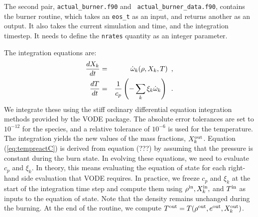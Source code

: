 The second pair, {\tt actual\_burner.f90} and {\tt
  actual\_burner\_data.f90}, contains the burner routine, which takes
an {\tt eos\_t} as an input, and returns another as an output. It also
takes the current simulation and time, and the integration
timestep. It needs to define the {\tt nrates} quantity as an integer
parameter.

The integration equations are:
\begin{eqnarray}
\frac{dX_k}{dt} &=& \dot\omega_k(\rho,X_k,T)\enskip, \label{eq:VODE1C} \\
\frac{dT}{dt} &=&\frac{1}{c_p} \left ( -\sum_k \xi_k  \dot\omega_k  \right )\enskip. \label{eq:tempreactC}
\end{eqnarray}
We integrate these using the stiff ordinary differential equation
integration methods provided by the VODE package.  The absolute error
tolerances are set to $10^{-12}$ for the species, and a relative
tolerance of $10^{-6}$ is used for the temperature.  The integration
yields the new values of the mass fractions, $X_k^{\rm out}$.  Equation
(\ref{eq:tempreactC}) is derived from equation (???) by assuming that
the pressure is constant during the burn state.  In evolving these
equations, we need to evaluate $c_p$ and $\xi_k$.  In theory, this
means evaluating the equation of state for each right-hand side
evaluation that VODE requires.  In practice, we freeze $c_p$ and
$\xi_k$ at the start of the integration time step and compute them
using $\rho^{\rm in}, X_k^{\rm in},$ and $T^{\rm in}$ as inputs to the equation of
state.  Note that the density remains unchanged during the burning.
At the end of the routine, we compute $T^{\rm out} =
T(\rho^{\rm out},e^{{\rm out}},X_k^{\rm out})$.

